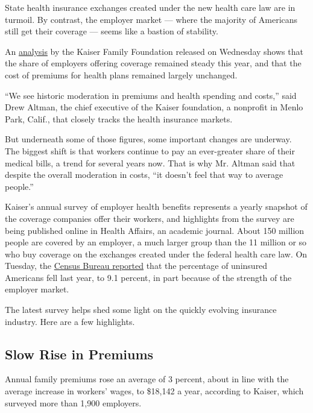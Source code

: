 State health insurance exchanges created under the new health care law
are in turmoil. By contrast, the employer market --- where the majority
of Americans still get their coverage --- seems like a bastion of
stability.

An \href{http://ehbs.kff.org/}{analysis} by the Kaiser Family Foundation
released on Wednesday shows that the share of employers offering
coverage remained steady this year, and that the cost of premiums for
health plans remained largely unchanged.

``We see historic moderation in premiums and health spending and
costs,'' said Drew Altman, the chief executive of the Kaiser foundation,
a nonprofit in Menlo Park, Calif., that closely tracks the health
insurance markets.

But underneath some of those figures, some important changes are
underway. The biggest shift is that workers continue to pay an
ever-greater share of their medical bills, a trend for several years
now. That is why Mr. Altman said that despite the overall moderation in
costs, ``it doesn't feel that way to average people.''

Kaiser's annual survey of employer health benefits represents a yearly
snapshot of the coverage companies offer their workers, and highlights
from the survey are being published online in Health Affairs, an
academic journal. About 150 million people are covered by an employer, a
much larger group than the 11 million or so who buy coverage on the
exchanges created under the federal health care law. On Tuesday, the
\href{http://www.nytimes3xbfgragh.onion/2016/09/14/business/economy/us-census-household-income-poverty-wealth-2015.html?hp\&action=click\&pgtype=Homepage\&clickSource=story-heading\&module=first-column-region\&region=top-news\&WT.nav=top-news\&_r=0}{Census
Bureau reported} that the percentage of uninsured Americans fell last
year, to 9.1 percent, in part because of the strength of the employer
market.

The latest survey helps shed some light on the quickly evolving
insurance industry. Here are a few highlights.

\hypertarget{slow-rise-in-premiums}{%
\subsection{Slow Rise in Premiums}\label{slow-rise-in-premiums}}

Annual family premiums rose an average of 3 percent, about in line with
the average increase in workers' wages, to \$18,142 a year, according to
Kaiser, which surveyed more than 1,900 employers.

